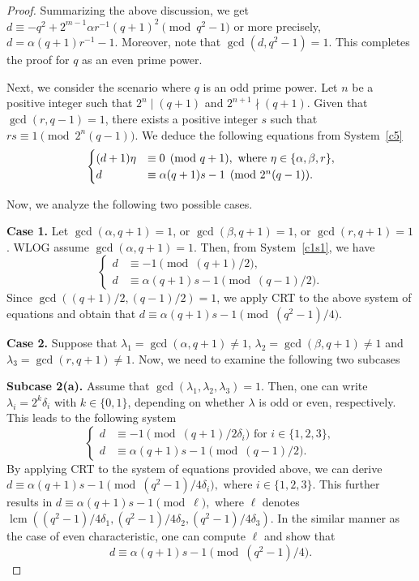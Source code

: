\documentclass[12pt,reqno]{amsart}
\numberwithin{equation}{section}
\theoremstyle{definition}
\DeclareMathOperator{\lcm}{lcm}
\begin{document}
\begin{proof}
Summarizing the above discussion, we get $d \equiv -q^2+2^{m-1}\alpha r^{-1}(q+1)^2 \pmod{q^2-1}$ or more precisely, $d=\alpha(q+1)r^{-1}-1 $. Moreover, note that $\gcd(d,q^2-1)=1$. This completes the proof for $q$ as an even prime power. 

Next, we consider the scenario where $q$ is an odd prime power.  Let $n$ be a positive integer such that $2^n \mid (q+1)$ and $2^{n+1} \nmid (q+1)$. Given that $\gcd(r,q-1)=1$, there exists a positive integer $s$ such that $rs\equiv 1\pmod {2^n(q-1)}$. We deduce the following equations from System~\eqref{c5}
\begin{align}{\label{c1s1}}
        \begin{cases}
        (d+1)\eta&  \equiv 0 \pmod {q+1}, ~\mbox{where } \eta \in \{\alpha, \beta, r\}, \\
        d & \equiv \alpha (q+1)s-1 \pmod {2^n(q-1)}.
        \end{cases}
\end{align}

Now, we analyze the following two possible cases.
			  
\textbf{Case 1.} Let $\gcd(\alpha,q+1)=1$, or $\gcd(\beta,q+1)=1$, or $\gcd(r,q+1)=1$. WLOG assume $\gcd(\alpha,q+1)=1$. Then, from System~\eqref{c1s1}, we have
\begin{equation*}
\begin{cases}
d & \equiv -1 \pmod {(q+1)/2}, \\
d & \equiv \alpha (q+1)s-1 \pmod {(q-1)/2}.
\end{cases}
\end{equation*}
Since $\gcd((q+1)/2,(q-1)/2)=1$, we apply CRT to the above system of equations and obtain that $d\equiv \alpha (q+1)s-1 \pmod {(q^2-1)/4}$.
		
\textbf{Case 2.}  Suppose that $ \lambda_{1}=\gcd(\alpha,q+1) \ne 1 $, $ \lambda_{2}=\gcd(\beta,q+1) \ne 1$ and $ \lambda_{3}=\gcd(r,q+1) \ne 1$. 
Now, we need to examine the following two subcases

\textbf{Subcase 2(a).} Assume that  $\gcd(\lambda_{1},\lambda_{2},\lambda_{3})=1$. Then, one can write $\lambda_{i}=2^k\delta_{i}$ with $k\in \{0,1\}$, depending on whether $\lambda$ is odd or even, respectively. This leads to the following system
		\begin{equation*}
		\begin{cases}
		d & \equiv -1 \pmod {(q+1)/2 \delta_{i}}
        \text{ for } i \in \{1,2,3\},  \\
		d & \equiv \alpha (q+1)s-1 \pmod {(q-1)/2}.
	\end{cases}
\end{equation*}
By applying CRT to the system of equations provided above, we can derive 
$ d\equiv \alpha{(q+1)}s-1 \pmod{(q^2-1)/4\delta_{i}}, \text{ where } i \in \{1,2,3\}.$ This further results in $ d\equiv \alpha(q+1)s-1 \pmod{\ell},$ where $\ell$ denotes $\lcm((q^2-1)/4\delta_{1},(q^2-1)/4\delta_{2},(q^2-1)/4\delta_{3})$.
In the similar manner as the case of even characteristic, one can compute $\ell$ and show that
\begin{equation}\label{c2imp}
d\equiv \alpha(q+1)s-1 \pmod{(q^2-1)/4}.
\end{equation} 


\end{proof}
\end{document}
